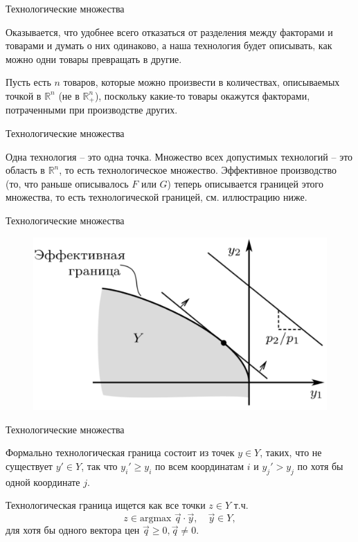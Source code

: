\documentclass{beamer}
\begin{document}
\begin{frame}{Технологические множества}

Оказывается, что удобнее всего отказаться от разделения между факторами и товарами и думать о них одинаково, а наша технология будет описывать, как можно одни товары превращать в другие.

Пусть есть $n$ товаров, которые можно произвести в количествах, описываемых точкой в $\mathbb{R}^n$ (не в $\mathbb{R}^n_+$), поскольку какие-то товары окажутся факторами, потраченными при производстве других. 

\end{frame}

\begin{frame}{Технологические множества}

Одна технология – это одна точка. Множество всех допустимых технологий – это область в $\mathbb{R}^n$, то есть \alert{технологическое множество}. Эффективное производство (то, что раньше описывалось $F$ или $G$) теперь описывается границей этого множества, то есть \alert{технологической границей}, см. иллюстрацию ниже.

\end{frame}

\begin{frame}{Технологические множества}

\begin{figure}[hbt]
\centering
\includegraphics[width=.8 \textwidth]{prod_set.png}
\end{figure}

\end{frame}

\begin{frame}{Технологические множества}

Формально технологическая граница состоит из точек $y \in Y$, таких, что не существует $y' \in Y$, так что $y_i' \geqslant y_i$ по всем координатам $i$ и $y_j' > y_j$ по хотя бы одной координате $j$.

\begin{lemma}
Технологическая граница ищется как все точки $z \in Y$ т.ч.
$$ z \in \text{argmax } \vec q \cdot \vec y, \quad \vec y \in Y,$$
для хотя бы одного вектора цен $\vec q \geqslant 0, \vec q \neq 0$.
\end{lemma}
\end{frame}
\end{document}
